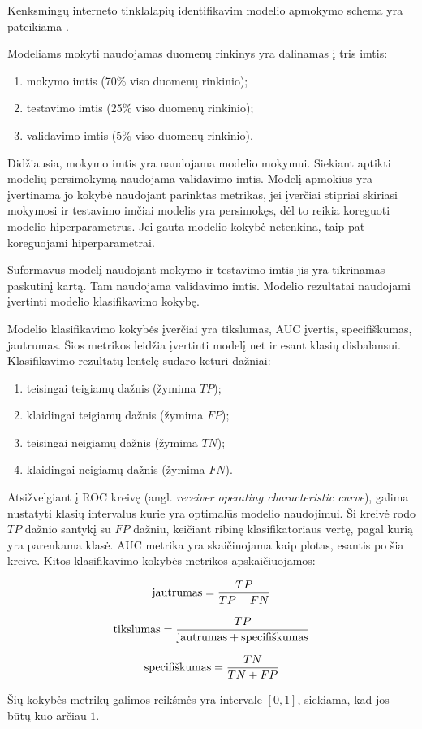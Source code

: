
Kenksmingų interneto tinklalapių identifikavim modelio apmokymo schema yra pateikiama .

Modeliams mokyti naudojamas duomenų rinkinys yra dalinamas į tris imtis:
\begin{enumerate}
    \item mokymo imtis (70\% viso duomenų rinkinio);
    \item testavimo imtis (25\% viso duomenų rinkinio);
    \item validavimo imtis (5\% viso duomenų rinkinio).
\end{enumerate}
Didžiausia, mokymo imtis yra naudojama modelio mokymui. Siekiant aptikti modelių persimokymą naudojama
validavimo imtis. Modelį apmokius yra įvertinama jo kokybė naudojant parinktas metrikas, jei įverčiai stipriai
skiriasi mokymosi ir testavimo imčiai modelis yra persimokęs, dėl to reikia koreguoti modelio hiperparametrus.
Jei gauta modelio kokybė netenkina,  taip pat koreguojami hiperparametrai.

Suformavus modelį naudojant mokymo ir testavimo imtis jis yra tikrinamas paskutinį kartą. Tam naudojama validavimo imtis.
Modelio rezultatai naudojami įvertinti modelio klasifikavimo kokybę.


Modelio klasifikavimo kokybės įverčiai yra tikslumas, AUC įvertis, specifiškumas, jautrumas. Šios metrikos leidžia
 įvertinti modelį net ir esant klasių disbalansui. Klasifikavimo rezultatų lentelę sudaro keturi dažniai:
\begin{enumerate}
    \item teisingai teigiamų dažnis (žymima $TP$);
    \item klaidingai teigiamų dažnis (žymima $FP$);
    \item teisingai neigiamų dažnis (žymima $TN$);
    \item klaidingai neigiamų dažnis (žymima $FN$).
\end{enumerate}

 Atsižvelgiant į ROC kreivę
(angl. \textit{receiver operating characteristic curve}), galima nustatyti
klasių intervalus kurie yra optimalūs modelio naudojimui. Ši kreivė rodo $TP$ dažnio
 santykį su $FP$ dažniu, keičiant ribinę klasifikatoriaus vertę, pagal
kurią yra parenkama klasė. AUC metrika yra skaičiuojama kaip plotas, esantis po šia kreive.
Kitos klasifikavimo kokybės metrikos apskaičiuojamos:

\begin{equation}
\text{jautrumas} = {TP \over {TP + FN}}
\end{equation}

\begin{equation}
\text{tikslumas} = {TP \over {\text{jautrumas} + \text{specifiškumas} }}
\end{equation}

\begin{equation}
\text{specifiškumas} = {TN \over {TN + FP}}
\end{equation}

Šių kokybės metrikų galimos reikšmės yra intervale $[0, 1]$, siekiama, kad jos būtų kuo arčiau $1$.
